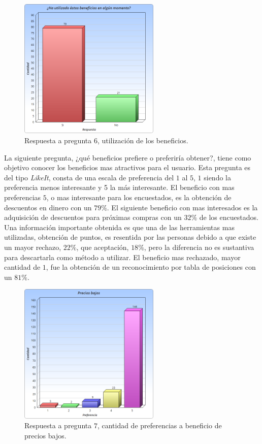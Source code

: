 \begin{figure}[!htb]
  \centering
  \includegraphics[width=0.6\textwidth]{images/Graficos/graf_5_4.png}
  \caption[chart5.4]{Respuesta a pregunta $6$, utilización de los beneficios.}
  \label{fig:chart5.4}
\end{figure}


La siguiente pregunta, ¿qué beneficios prefiere o preferiría obtener?, tiene como objetivo conocer los
 beneficios mas atractivos para el usuario. Esta pregunta es del tipo \emph{LikeIt}, consta de una
escala de preferencia del $1$ al $5$, $1$ siendo la preferencia menos interesante y 5 la más interesante.
 El beneficio con mas preferencias $5$, o mas interesante para los encuestados, es la obtención de
descuentos en dinero con un $79\%$. El siguiente beneficio con mas interesados es la adquisición
de descuentos para próximas compras con un $32\%$ de los encuestados. Una información importante
obtenida es que una de las herramientas mas utilizadas, obtención de puntos, es resentida por las
personas debido a que existe un mayor rechazo, $22\%$, que aceptación, $18\%$, pero la diferencia
no es sustantiva para descartarla como método a utilizar.
El beneficio mas rechazado, mayor cantidad de $1$, fue la obtención de un reconocimiento por tabla
 de posiciones con un $81\%$.


\begin{figure}[!htb]
  \centering
  \includegraphics[width=0.6\textwidth]{images/Graficos/graf_5_5.png}
  \caption[chart5.5]{Respuesta a pregunta $7$, cantidad de preferencias a beneficio de precios bajos.}
  \label{fig:chart5.5}
\end{figure}

